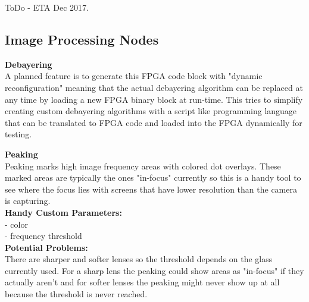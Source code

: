 ToDo - ETA Dec 2017.





\subsection{Image Processing Nodes}

\textbf{Debayering}\\

A planned feature is to generate this FPGA code block with "dynamic reconfiguration" meaning that the actual debayering algorithm can be replaced at any time by loading a new FPGA binary block at run-time. This tries to simplify creating custom debayering algorithms with a script like programming language that can be translated to FPGA code and loaded into the FPGA dynamically for testing. 

\textbf{Peaking}\\

Peaking marks high image frequency areas with colored dot overlays. These marked areas are typically the ones "in-focus" currently so this is a handy tool to see where the focus lies with screens that have lower resolution than the camera is capturing.\\

\textbf{Handy Custom Parameters:}\\

- color\\
- frequency threshold \\


\textbf{Potential Problems:}\\

There are sharper and softer lenses so the threshold depends on the glass currently used. For a sharp lens the peaking could show areas as "in-focus" if they actually aren't and for softer lenses the peaking might never show up at all because the threshold is never reached.\\